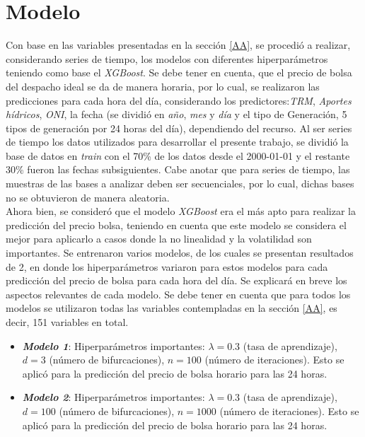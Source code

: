 \documentclass[conference, 10pt]{IEEEtran}
\begin{document}
\section{Modelo} \label{BB}

Con base en las variables presentadas en la sección \ref{AA}, se procedió a realizar, considerando series de tiempo, los modelos con diferentes hiperparámetros teniendo como base el \textit{XGBoost}. Se debe tener en cuenta, que el precio de bolsa del despacho ideal se da de manera horaria, por lo cual, se realizaron las predicciones para cada hora del día, considerando los predictores:\textit{TRM}, \textit{Aportes hídricos}, \textit{ONI}, la fecha (se dividió en \textit{año}, \textit{mes} y \textit{día} y el tipo de Generación, 5 tipos de generación por 24 horas del día), dependiendo del recurso. Al ser series de tiempo los datos utilizados para desarrollar el presente trabajo, se dividió la base de datos en \textit{train} con el 70\% de los datos desde el 2000-01-01 y el restante 30\% fueron las fechas subsiguientes. Cabe anotar que para series de tiempo, las muestras de las bases a analizar deben ser secuenciales, por lo cual, dichas bases no se obtuvieron de manera aleatoria.\\
Ahora bien, se consideró que el modelo \textit{XGBoost} era el más apto para realizar la predicción del precio bolsa, teniendo en cuenta que este modelo se considera el mejor para aplicarlo a casos donde la no linealidad y la volatilidad son importantes. Se entrenaron varios modelos, de los cuales se presentan resultados de 2, en donde los hiperparámetros variaron para estos modelos para cada predicción del precio de bolsa para cada hora del día. Se explicará en breve los aspectos relevantes de cada modelo. Se debe tener en cuenta que para todos los modelos se utilizaron todas las variables contempladas en la sección \ref{AA}, es decir, 151 variables en total.

\begin{itemize}
\item \textit{\textbf{Modelo 1}}: Hiperparámetros importantes: $\lambda=0.3$ (tasa de aprendizaje), $d=3$ (número de bifurcaciones), $n=100$ (número de iteraciones). Esto se aplicó para la predicción del precio de bolsa horario para las 24 horas.
\item \textit{\textbf{Modelo 2}}: Hiperparámetros importantes: $\lambda=0.3$ (tasa de aprendizaje), $d=100$ (número de bifurcaciones), $n=1000$ (número de iteraciones). Esto se aplicó para la predicción del precio de bolsa horario para las 24 horas.
\end{itemize}
\end{document}
